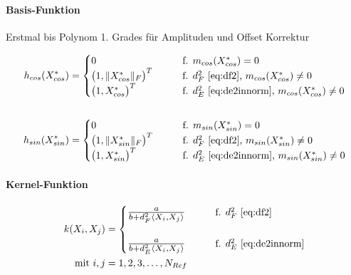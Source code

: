 \paragraph*{Basis-Funktion}

Erstmal bis Polynom 1. Grades für Amplituden und Offset Korrektur

\begin{align}\label{eq:hfun}
	h_{cos}(X_{cos}^*) &=
		\begin{cases}
			0								 &\qquad \text{f. } m_{cos}(X_{cos}^*) = 0 \\
			\big( 1, \|X_{cos}^*\|_F \big)^T &\qquad \text{f. } d_F^2 \text{ \autoref{eq:df2}, }       m_{cos}(X_{cos}^*) \ne 0 \\
			\big( 1, X_{cos}^* \big)^T       &\qquad \text{f. } d_E^2 \text{ \autoref{eq:de2innorm}, } m_{cos}(X_{cos}^*) \ne 0
		\end{cases} \nonumber \\
	\\
	h_{sin}(X_{sin}^*) &=
		\begin{cases}
			0								 &\qquad \text{f. } m_{sin}(X_{sin}^*) = 0 \\
			\big( 1, \|X_{sin}^*\|_F \big)^T &\qquad \text{f. } d_F^2 \text{ \autoref{eq:df2}, }       m_{sin}(X_{sin}^*) \ne 0 \\
			\big( 1, X_{sin}^* \big)^T       &\qquad \text{f. } d_E^2 \text{ \autoref{eq:de2innorm}, } m_{sin}(X_{sin}^*) \ne 0
		\end{cases} \nonumber
\end{align}



\paragraph*{Kernel-Funktion}


\begin{align}\label{eq:kfun}
	k(X_i, X_j) &= 
		\begin{cases}
			\resizebox{.17\linewidth}{!}{$\frac{a}{b + d_F^2\langle X_i, X_j \rangle}$} &\qquad \text{f. } d_F^2 \text{ \autoref{eq:df2}} \\\\
			\resizebox{.17\linewidth}{!}{$\frac{a}{b + d_E^2\langle X_i, X_j \rangle}$} &\qquad \text{f. } d_E^2 \text{ \autoref{eq:de2innorm}}
		\end{cases} \\
\text{mit } i,j &= 1,2,3,\ldots,N_{Ref} \nonumber
\end{align}



